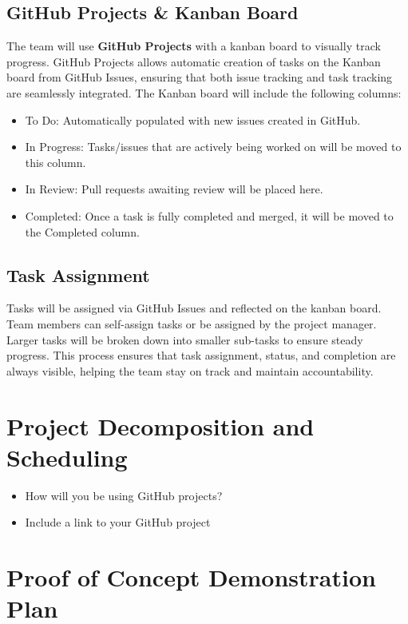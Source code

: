 \documentclass{article}
\begin{document}
\subsection{GitHub Projects \& Kanban Board}
The team will use \textbf{GitHub Projects} with a kanban board to visually track progress. GitHub Projects allows automatic creation of tasks on the Kanban board from GitHub Issues, ensuring that both issue tracking and task tracking are seamlessly integrated. The Kanban board will include the following columns:
\begin{itemize}
    \item To Do: Automatically populated with new issues created in GitHub.
    \item In Progress: Tasks/issues that are actively being worked on will be moved to this column.
    \item In Review: Pull requests awaiting review will be placed here.
    \item Completed: Once a task is fully completed and merged, it will be moved to the Completed column.
\end{itemize}

\subsection{Task Assignment}
Tasks will be assigned via GitHub Issues and reflected on the kanban board. Team members can self-assign tasks or be assigned by the project manager. Larger tasks will be broken down into smaller sub-tasks to ensure steady progress. This process ensures that task assignment, status, and completion are always visible, helping the team stay on track and maintain accountability.

\section{Project Decomposition and Scheduling}

\begin{itemize}
  \item How will you be using GitHub projects?
  \item Include a link to your GitHub project
\end{itemize}


\section{Proof of Concept Demonstration Plan}
\end{document}
